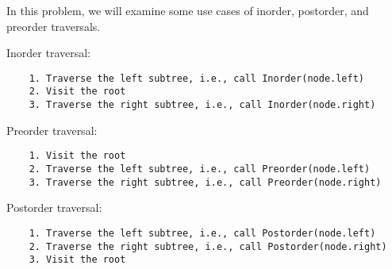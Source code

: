 \question In this problem, we will examine some use cases of inorder,
postorder, and preorder traversals.

Inorder traversal:

\begin{lstlisting}
    1. Traverse the left subtree, i.e., call Inorder(node.left)
    2. Visit the root
    3. Traverse the right subtree, i.e., call Inorder(node.right)
\end{lstlisting}

Preorder traversal:

\begin{lstlisting}
    1. Visit the root
    2. Traverse the left subtree, i.e., call Preorder(node.left)
    3. Traverse the right subtree, i.e., call Preorder(node.right)
\end{lstlisting}

Postorder traversal:

\begin{lstlisting}
    1. Traverse the left subtree, i.e., call Postorder(node.left)
    2. Traverse the right subtree, i.e., call Postorder(node.right)
    3. Visit the root
\end{lstlisting}

